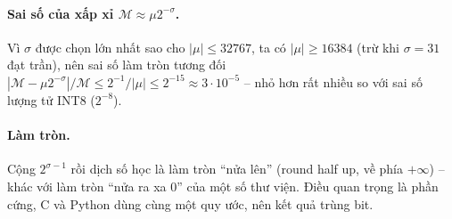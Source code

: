 \paragraph{Sai số của xấp xỉ $\mathcal{M}\approx\mu2^{-\sigma}$.} Vì $\sigma$ được chọn lớn nhất sao cho $|\mu|\le32767$, ta có $|\mu|\ge 16384$ (trừ khi $\sigma=31$ đạt trần), nên sai số làm tròn tương đối $|\mathcal{M}-\mu2^{-\sigma}|/\mathcal{M}\le 2^{-1}/|\mu|\le2^{-15}\approx3\cdot10^{-5}$ -- nhỏ hơn rất nhiều so với sai số lượng tử INT8 ($2^{-8}$).

\paragraph{Làm tròn.} Cộng $2^{\sigma-1}$ rồi dịch số học là làm tròn ``nửa lên'' (round half up, về phía $+\infty$) -- khác với làm tròn ``nửa ra xa 0'' của một số thư viện. Điều quan trọng là phần cứng, C và Python dùng cùng một quy ước, nên kết quả trùng bit.
